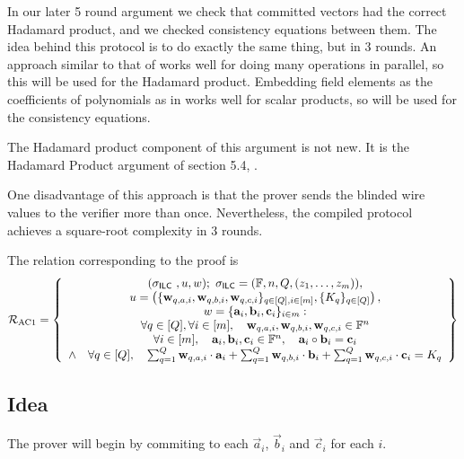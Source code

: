In our later 5 round argument we check that committed vectors had the correct Hadamard product, and we checked consistency equations between them. The idea behind this protocol is to do exactly the same thing, but in 3 rounds. An approach similar to that of \cite{PHGR13} works well for doing many operations in parallel, so this will be used for the Hadamard product. Embedding field elements as the coefficients of polynomials as in \cite{Groth2009b} works well for scalar products, so will be used for the consistency equations.

The Hadamard product component of this argument is not new. It is the Hadamard Product argument of section 5.4, \cite{Bayer2014}.

One disadvantage of this approach is that the prover sends the blinded wire values to the verifier more than once. Nevertheless, the compiled protocol achieves a square-root complexity in 3 rounds.

The relation corresponding to the proof is
\[
\mathcal{R}_{\textnormal{AC1}}=\left\{\begin{array}{c}
(\mathsf{\sigma}_{\mathsf{ILC}~},u,w); \ \mathsf{\sigma}_{\mathsf{ILC}} = (\mathbb{F},n,Q,(z_1,\ldots,z_m)), \\
u = \left( \{\mathbf{w}_{q,{a,i}},\mathbf{w}_{q,{b,i}},\mathbf{w}_{q,{c,i}}\}_{q \in [Q], i \in [m]}, \{K_{q}\}_{q \in [Q]}\right), \\
w = \{\mathbf{a}_i,\mathbf{b}_i,\mathbf{c}_i\}_{i \in m}:\\
\forall q \in [Q], \forall i \in [m], \quad \mathbf{w}_{q,a,i}, \mathbf{w}_{q,b,i}, \mathbf{w}_{q,c,i} \in \mathbb{F}^n \\
\forall i \in [m], \quad \mathbf{a}_i,\mathbf{b}_i,\mathbf{c}_i \in \mathbb{F}^n, \quad \mathbf{a}_i \circ \mathbf{b}_i=\mathbf{c}_i \\
\wedge \quad \forall q \in [Q], \quad \sum_{q=1}^Q \mathbf{w}_{q,a,i} \cdot \mathbf{a}_i + \sum_{q=1}^Q \mathbf{w}_{q,b,i} \cdot \mathbf{b}_i + \sum_{q=1}^Q \mathbf{w}_{q,c,i} \cdot \mathbf{c}_i = K_q
\end{array}\right\}
\]

\subsection{Idea}

The prover will begin by commiting to each $\vec{a}_{i}$, $\vec{b}_i$ and $\vec{c}_i$ for each $i$.

